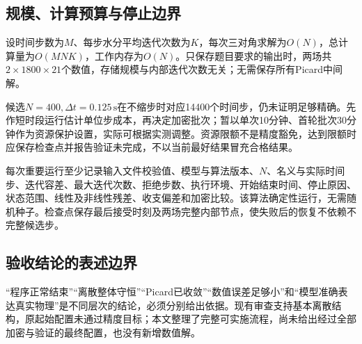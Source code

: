 \documentclass[UTF8,a4paper,zihao=-4,fontset=none]{ctexart}
\numberwithin{equation}{section}
\newcommand{\units}[1]{\,\mathrm{#1}}
\begin{document}
\subsection{规模、计算预算与停止边界}
设时间步数为$M$、每步水分平均迭代次数为$K$，每次三对角求解为$O(N)$，总计算量为$O(MNK)$，工作内存为$O(N)$。只保存题目要求的输出时，两场共$2\times1800\times21$个数值，存储规模与内部迭代次数无关；无需保存所有Picard中间解。

候选$N=400,\Delta t=0.125\units s$在不缩步时对应14400个时间步，仍未证明足够精确。先作短时段运行估计单位步成本，再决定加密批次；暂以单次10分钟、首轮批次30分钟作为资源保护设置，实际可根据实测调整。资源限额不是精度豁免，达到限额时应保存检查点并报告验证未完成，不以当前最好结果冒充合格结果。

每次重要运行至少记录输入文件校验值、模型与算法版本、$N$、名义与实际时间步、迭代容差、最大迭代次数、拒绝步数、执行环境、开始结束时间、停止原因、状态范围、线性及非线性残差、收支偏差和加密比较。该算法确定性运行，无需随机种子。检查点保存最后接受时刻及两场完整内部节点，使失败后的恢复不依赖不完整候选步。

\subsection{验收结论的表述边界}
“程序正常结束”“离散整体守恒”“Picard已收敛”“数值误差足够小”和“模型准确表达真实物理”是不同层次的结论，必须分别给出依据。现有审查支持基本离散结构，原起始配置未通过精度目标；本文整理了完整可实施流程，尚未给出经过全部加密与验证的最终配置，也没有新增数值解。

\appendix
\end{document}
